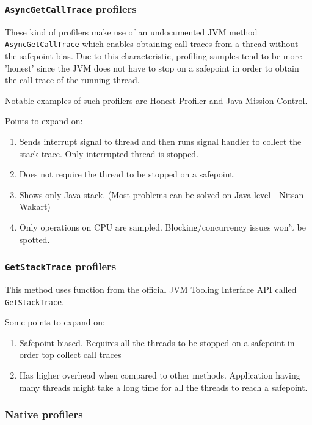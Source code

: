 \documentclass[..thesis.tex]{subfiles}
\begin{document}
\subsubsection{\texttt{AsyncGetCallTrace} profilers}
These kind of profilers make use of an undocumented JVM method \texttt{Async\-Get\-Call\-Trace} \cite{agct_source} which enables obtaining call traces from a thread without the safepoint bias. Due to this characteristic, profiling samples tend to be more 'honest' since the JVM does not have to stop on a safepoint in order to obtain the call trace of the running thread.

Notable examples of such profilers are Honest Profiler and Java Mission Control. 


Points to expand on:
\begin{enumerate}
	\item Sends interrupt signal to thread and then runs signal handler to collect the stack trace. Only interrupted thread is stopped.
	\item Does not require the thread to be stopped on a safepoint.
	\item Shows only Java stack. (Most problems can be solved on Java level - Nitsan Wakart)
	\item Only operations on CPU are sampled. Blocking/concurrency issues won't be spotted.
\end{enumerate}



\subsubsection{\texttt{GetStackTrace} profilers}
This method uses function from the official JVM Tooling Interface API \cite{jvmti_doc} called \texttt{GetStackTrace}.

Some points to expand on:
\begin{enumerate}
	\item Safepoint biased. Requires all the threads to be stopped on a safepoint in order top collect call traces
	\item Has higher overhead when compared to other methods. Application having many threads might take a long time for all the threads to reach a safepoint.
\end{enumerate}

\subsubsection{Native profilers}
\end{document}
